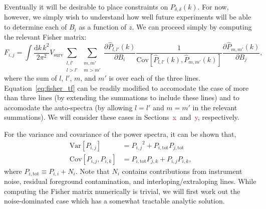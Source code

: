 \documentclass{aastex62}
\newcommand{\Gus}[1]{\textcolor{red}{#1}}
\newcommand{\beq}{\begin{equation}}
\newcommand{\eeq}{\end{equation}}
\newcommand{\ps}[1]{\ensuremath{P_{#1,#1}}}
\newcommand{\xps}[2]{\ensuremath{P_{#1,#2}}}
\newcommand{\denps}{\ensuremath{P_{\delta,\delta}}}
\newcommand{\pstot}[1]{\ensuremath{P_{#1,\text{tot}}}}
\newcommand{\Var}[1]{\mathrm{Var}[#1]}
\newcommand{\Cov}[2]{\mathrm{Cov}[#1,#2]}
\begin{document}
Eventually it will be desirable to place constraints on $\denps(k)$. For now,
however, we simply wish to understand how well future experiments will be able
to determine each of $B_i$ as a function of $z$. We can proceed simply by
computing the relevant Fisher matrix:
\beq\label{eq:fisher_tf}
F_{i,j} = 
\int \frac{\text{d}k\,k^2}{2\pi^2} V_{\text{surv}} 
\sum_{\substack{l,l'\\l > l'}} \sum_{\substack{m,m'\\m > m'}}
\frac{\partial \hat{P}_{l,l'}(k)}{\partial B_i}
\frac{1}{\Cov{\hat{P}_{l,l'}(k)}{\hat{P}_{m,m'}(k)}} 
\frac{\partial \hat{P}_{m,m'}(k)}{\partial B_j}\text{,}
\eeq
where the sum of $l$, $l'$, $m$, and $m'$ is over each of the three lines.
Equation~\ref{eq:fisher_tf} can be readily modified to accomodate the case of
more than three lines (by extending the summations to include these lines) and
to accomodate the auto-spectra (by allowing $l=l'$ and $m=m'$ in the relevant
summations). We will consider these cases in Sections~\Gus{x}~and~\Gus{y},
respectively.

For the variance and covariance of the power spectra, it can be shown that,
\beq\label{eq:var_cov}
\begin{split}
\Var{\xps{i}{j}} &= \xps{i}{j}^2 + \pstot{i}\pstot{j} \\
\Cov{\xps{i}{j}}{\xps{i}{k}} &= \pstot{i}\xps{j}{k} +
\xps{i}{j}\xps{i}{k}\text{,}
\end{split}
\eeq
where $\pstot{i} \equiv \ps{i} + N_i$. Note that $N_i$ contains contributions
from instrument noise, residual foreground contamination, and
interloping/extraloping lines. While computing the Fisher matrix numerically
is trivial, we will first work out the noise-dominated case which has a
somewhat tractable analytic solution.
\end{document}
